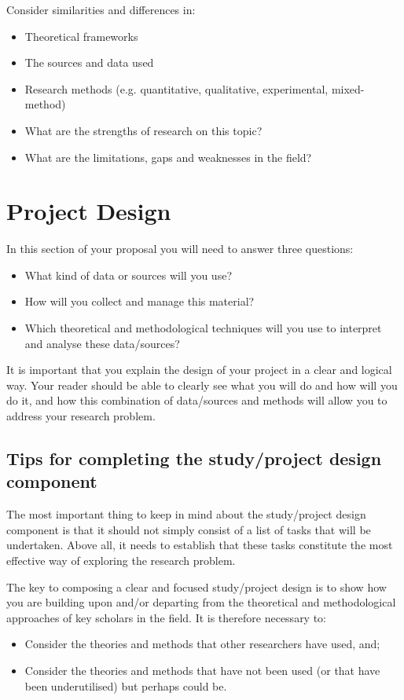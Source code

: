 \documentclass[12pt, a4paper]{article}
\begin{document}
Consider similarities and differences in:
\begin{itemize}
\item Theoretical frameworks
\item The sources and data used
\item Research methods (e.g. quantitative, qualitative, experimental, mixed-method)
\item What are the strengths of research on this topic?
\item What are the limitations, gaps and weaknesses in the field?
\end{itemize}


\section{Project Design}
In this section of your proposal you will need to answer three questions:
\begin{itemize}
\item What kind of data or sources will you use?
\item How will you collect and manage this material?
\item Which theoretical and methodological techniques will you use to interpret and analyse these data/sources?
\end{itemize}

It is important that you explain the design of your project in a clear and logical way. Your reader should be able to clearly see what you will do and how will you do it, and how this combination of data/sources and methods will allow you to address your research problem.

\subsection{Tips for completing the study/project design component}
The most important thing to keep in mind about the study/project design component is that it should not simply consist of a list of tasks that will be undertaken. Above all, it needs to establish that these tasks constitute the most effective way of exploring the research problem.

The key to composing a clear and focused study/project design is to show how you are building upon and/or departing from the theoretical and methodological approaches of key scholars in the field. It is therefore necessary to:
\begin{itemize}
\item Consider the theories and methods that other researchers have used, and;
\item Consider the theories and methods that have not been used (or that have been underutilised) but perhaps could be.
\end{itemize}
\end{document}
